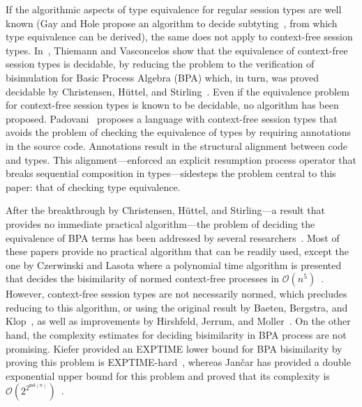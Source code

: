 If the algorithmic aspects of type equivalence for regular session
types are well known (Gay and Hole propose an algorithm to decide
subtyting~\cite{DBLP:journals/acta/GayH05}, from which type
equivalence can be derived), the same does not apply to context-free
session types.
%
In~\cite{thiemann2016context}, Thiemann and Vasconcelos show that the
equivalence of context-free session types is decidable, by reducing
the problem to the verification of bisimulation for Basic Process
Algebra (BPA) which, in turn, was proved decidable by Christensen,
H{\"{u}}ttel, and Stirling~\cite{DBLP:journals/iandc/ChristensenHS95}.
%
Even if the equivalence problem for context-free session types is
known to be decidable, no algorithm has been proposed.
%
Padovani~\cite{DBLP:conf/esop/Padovani17} proposes a language with
context-free session types that avoids the problem of checking the
equivalence of types by requiring annotations in the source
code. Annotations result in the structural alignment between code and
types. This alignment---enforced an explicit resumption process
operator that breaks sequential composition in types---sidesteps the
problem central to this paper: that of checking type equivalence.

After the breakthrough by Christensen, H\"uttel, and Stirling---a
result that provides no immediate practical algorithm---the problem of
deciding the equivalence of BPA terms has been addressed by several
researchers~\cite{DBLP:conf/mfcs/BurkartCS95,DBLP:journals/iandc/ChristensenHS95,czerwinski2010fast,janvcar1999techniques}.
Most of these papers provide no practical algorithm that can be
readily used, except the one by Czerwinski and Lasota where a
polynomial time algorithm is presented that decides the bisimilarity
of normed context-free processes in
$\mathcal{O}(n^5)$~\cite{czerwinski2010fast}.
%
However, context-free session types are not necessarily normed, which
precludes reducing to this algorithm, or using the original result by
Baeten, Bergstra, and Klop~\cite{baeten1993decidability}, as well as
improvements by Hirshfeld, Jerrum, and
Moller~\cite{DBLP:journals/tcs/HirshfeldJM96,DBLP:conf/concur/HirshfeldM94}.
On the other hand, the complexity estimates for deciding bisimilarity
in BPA process are not promising. Kiefer provided an EXPTIME lower
bound for BPA bisimilarity by proving this problem is
EXPTIME-hard~\cite{kiefer2013bpa}, whereas Jan\v car has provided a
double exponential upper bound for this problem and proved that its
complexity is
$\mathcal{O}(2^{2^{\mathsf{pol}(n)}})$~\cite{jancar2012bisimilarity}.

